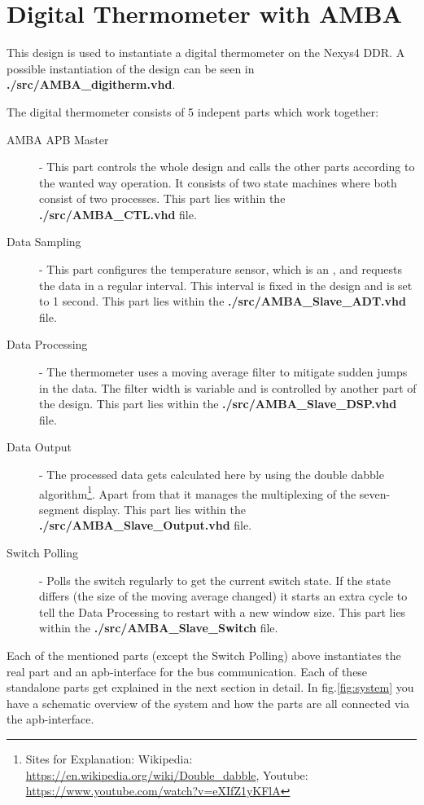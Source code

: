 \documentclass[%
	a4paper,
]
{article}
\begin{document}
\section{Digital Thermometer with AMBA}
\label{sec:characterization}

This design is used to instantiate a digital thermometer on the Nexys4 DDR.
A possible instantiation of the design can be seen in \textbf{./src/AMBA_digitherm.vhd}.


The digital thermometer consists of 5 indepent parts which work together:
\begin{description}
\item[AMBA APB Master] - This part controls the whole design and calls 
the other parts according to the wanted way operation. It consists of 
two state machines where both consist of two processes. This part lies within
the \mbox{\textbf{./src/AMBA_CTL.vhd}} file.
\item[Data Sampling] - This part configures the temperature sensor, which 
is an \autocite{ADT7420}, and requests the data in a regular interval. This interval 
is fixed in the design and is set to 1 second. This part lies within the 
\mbox{\textbf{./src/AMBA_Slave_ADT.vhd}} file.
\item[Data Processing] - The thermometer uses a moving average filter
to mitigate sudden jumps in the data. The filter width is variable and
is controlled by another part of the design. This part lies within the 
\mbox{\textbf{./src/AMBA_Slave_DSP.vhd}} file.
\item[Data Output] - The processed data gets calculated here by using the 
double dabble algorithm\footnote{Sites for Explanation: Wikipedia: \url{https://en.wikipedia.org/wiki/Double_dabble}, Youtube: \url{https://www.youtube.com/watch?v=eXIfZ1yKFlA}}. Apart from that
it manages the multiplexing of the seven-segment display. This part lies 
within the \mbox{\textbf{./src/AMBA_Slave_Output.vhd}} file.
\item[Switch Polling] - Polls the switch regularly to get the current switch
state. If the state differs (the size of the moving average changed) it starts
an extra cycle to tell the Data Processing to restart with a new window size.
This part lies within the \mbox{\textbf{./src/AMBA_Slave_Switch}} file.
\end{description}

Each of the mentioned parts (except the Switch Polling) above instantiates the real part and an apb\autocite{apb}-interface
for the bus communication. Each of these standalone parts get explained in the next 
section in detail. In fig.\ref{fig:system} you have a schematic overview of the system
and how the parts are all connected via the apb-interface.
\end{document}
